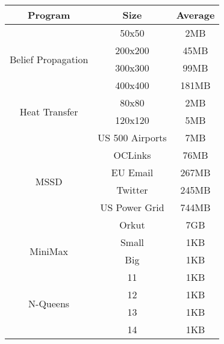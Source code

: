 \begin{tabular}{c | c | c } \hline
	\textbf{Program} & \textbf{Size} & \textbf{Average} \\ \hline \hline
	\multirow{4}{*}{Belief Propagation}  & 50x50 & 2MB\\
		 & 200x200 & 45MB\\
		 & 300x300 & 99MB\\
		 & 400x400 & 181MB\\
	\hline
	\multirow{2}{*}{Heat Transfer}  & 80x80 & 2MB\\
		 & 120x120 & 5MB\\
	\hline
	\multirow{6}{*}{MSSD}  & US 500 Airports & 7MB\\
		 & OCLinks & 76MB\\
		 & EU Email & 267MB\\
		 & Twitter & 245MB\\
		 & US Power Grid & 744MB\\
		 & Orkut & 7GB\\
	\hline
	\multirow{2}{*}{MiniMax}  & Small & 1KB\\
		 & Big & 1KB\\
	\hline
	\multirow{4}{*}{N-Queens}  & 11 & 1KB\\
		 & 12 & 1KB\\
		 & 13 & 1KB\\
		 & 14 & 1KB\\
	\hline
\end{tabular}
